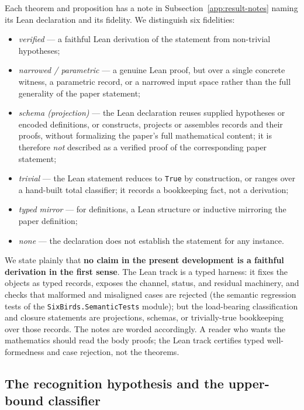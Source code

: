 Each theorem and proposition has a note in Subsection~\ref{app:result-notes}
naming its Lean declaration and its fidelity. We distinguish six fidelities:
\begin{itemize}[topsep=2pt,itemsep=1pt]
  \item \emph{verified} --- a faithful Lean derivation of the statement from
    non-trivial hypotheses;
  \item \emph{narrowed / parametric} --- a genuine Lean proof, but over a single
    concrete witness, a parametric record, or a narrowed input space rather than
    the full generality of the paper statement;
  \item \emph{schema (projection)} --- the Lean declaration reuses
    supplied hypotheses or encoded definitions, or constructs, projects or
    assembles records and their proofs, without formalizing the paper's
    full mathematical content; it is therefore \emph{not} described as a
    verified proof of the corresponding paper statement;
  \item \emph{trivial} --- the Lean statement reduces to \texttt{True} by
    construction, or ranges over a hand-built total classifier; it records a
    bookkeeping fact, not a derivation;
  \item \emph{typed mirror} --- for definitions, a Lean structure or inductive
    mirroring the paper definition;
  \item \emph{none} --- the declaration does not establish the statement for
    any instance.
\end{itemize}
We state plainly that \textbf{no claim in the present development is a faithful
derivation in the first sense}. The Lean track is a typed harness: it fixes the
objects as typed records, exposes the channel, status, and residual machinery,
and checks that malformed and misaligned cases are rejected (the semantic
regression tests of the \texttt{SixBirds.SemanticTests} module); but the
load-bearing classification and closure statements are projections, schemas, or
trivially-true bookkeeping over those records. The notes are worded
accordingly. A reader who wants the mathematics should read the body proofs; the
Lean track certifies typed well-formedness and case rejection, not the theorems.

\subsection{The recognition hypothesis and the upper-bound classifier}\label{app:recognition}

